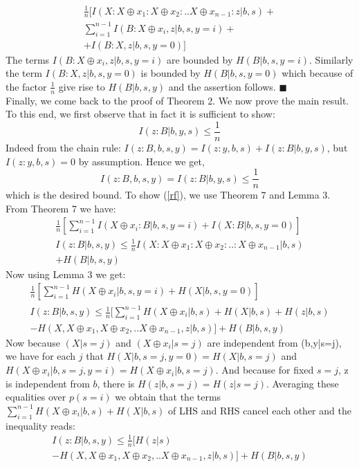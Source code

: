 \begin{multline}
\frac{1}{n}[ I(X:X\oplus x_1:X\oplus x_2:..X\oplus x_{n-1}:z|b,s)+ \\ \sum_{i=1}^{n-1}I(B:X\oplus x_i,z|b,s,y=i)+ \\
 + I(B:X,z|b,s,y=0)]
\end{multline}
The terms $I(B:X\oplus x_i,z|b,s,y=i)$ are bounded by $H(B|b,s,y=i)$. Similarly the term $I(B:X,z|b,s,y=0)$ is bounded by $H(B|b,s,y=0)$ which because of the factor $\frac{1}{n}$ give rise to $H(B|b,s,y)$ and the assertion follows. $\blacksquare$ \\
Finally, we come back to the proof of Theorem 2. We now prove the main result. To this end, we first observe that in fact it is sufficient to show:
\begin{equation} \label{rf}
I(z:B|b,y,s) \leq \frac{1}{n}
\end{equation}
Indeed from the chain rule: $I(z:B,b,s,y)=I(z:y,b,s)+I(z:B|b,y,s)$, but $I(z:y,b,s)=0$ by assumption. Hence we get,
\begin{equation}
I(z:B,b,s,y)=I(z:B|b,y,s) \leq \frac{1}{n}
\end{equation}
which is the desired bound. To show (\ref{rf}), we use Theorem 7 and Lemma 3. From Theorem 7 we have:
\begin{multline}
 \frac{1}{n}[\sum_{i=1}^{n-1}I(X\oplus x_i:B|b,s,y=i) + I(X:B|b,s,y=0)] \\ 
I(z:B|b,s,y) \leq \frac{1}{n}I(X:X\oplus x_1:X\oplus x_2:..:X\oplus x_{n-1} |b,s) \\
+H(B|b,s,y)
\end{multline}
Now using Lemma 3 we get:
\begin{multline}
 \frac{1}{n}[\sum_{i=1}^{n-1}H(X\oplus x_i|b,s,y=i) + H(X|b,s,y=0)] \\ 
I(z:B|b,s,y) \leq \frac{1}{n}[\sum_{i=1}^{n-1}H(X\oplus x_i|b,s)+H(X|b,s)+H(z|b,s)\\-H(X,X\oplus x_1,X\oplus x_2,..X\oplus x_{n-1},z|b,s)]+H(B|b,s,y)
\end{multline}
Now because $(X|s=j)$ and $(X\oplus x_i|s=j)$ are independent from (b,y|s=j), we have for each $j$ that $H(X|b,s=j,y=0)=H(X|b,s=j)$ and $H(X\oplus x_i|b,s=j,y=i)=H(X\oplus x_i|b,s=j)$. And because for fixed $s=j$, z is independent from $b$, there is $H(z|b,s=j)=H(z|s=j)$. Averaging these equalities over $p(s=i)$ we obtain that the terms $\sum_{i=1}^{n-1}H(X\oplus x_i|b,s)+H(X|b,s)$ of LHS and RHS cancel each other and the inequality reads:
\begin{multline} 
I(z:B|b,s,y) \leq \frac{1}{n}[H(z|s)\\-H(X,X\oplus x_1,X\oplus x_2,..X\oplus x_{n-1},z|b,s)]+H(B|b,s,y)
\end{multline}
